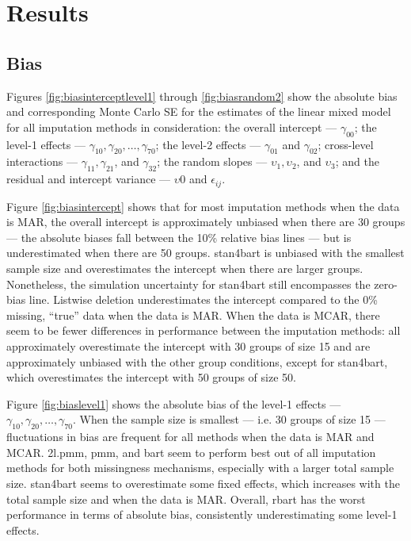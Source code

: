 \documentclass[3p,12pt,a4paper]{elsarticle}
\begin{document}
\section{Results}
\graphicspath{{./graphs/}}
\subsection{Bias}
Figures \ref{fig:biasinterceptlevel1} through \ref{fig:biasrandom2} show the absolute bias and corresponding Monte Carlo SE for the estimates of the linear mixed model for all imputation methods in consideration: the overall intercept --- $\gamma_{00}$; the level-1 effects --- $\gamma_{10}, \gamma_{20},\dots,\gamma_{70}$; the level-2 effects --- $\gamma_{01}$ and $\gamma_{02}$; cross-level interactions --- $\gamma_{11}, \gamma_{21}$, and $\gamma_{32}$; the random slopes --- $\upsilon_{1}, \upsilon_{2}$, and $\upsilon_{3}$; and the residual and intercept variance --- $\upsilon{0}$ and $\epsilon_{ij}$.

Figure \ref{fig:biasintercept} shows that for most imputation methods when the data is MAR, the overall intercept is approximately unbiased when there are 30 groups --- the absolute biases fall between the 10\% relative bias lines --- but is underestimated when there are 50 groups. stan4bart is unbiased with the smallest sample size and overestimates the intercept when there are larger groups. Nonetheless, the simulation uncertainty for stan4bart still encompasses the zero-bias line. Listwise deletion underestimates the intercept compared to the 0\% missing, ``true'' data when the data is MAR.  
When the data is MCAR, there seem to be fewer differences in performance between the imputation methods: all approximately overestimate the intercept with 30 groups of size 15 and are approximately unbiased with the other group conditions, except for stan4bart, which overestimates the intercept with 50 groups of size 50. 

Figure \ref{fig:biaslevel1} shows the absolute bias of the level-1 effects --- $\gamma_{10}, \gamma_{20},\dots,\gamma_{70}$. When the sample size is smallest --- i.e. 30 groups of size 15 --- fluctuations in bias are frequent for all methods when the data is MAR and MCAR. 2l.pmm, pmm, and bart seem to perform best out of all imputation methods for both missingness mechanisms, especially with a larger total sample size. stan4bart seems to overestimate some fixed effects, which increases with the total sample size and when the data is MAR. Overall, rbart has the worst performance in terms of absolute bias, consistently underestimating some level-1 effects.
\end{document}
